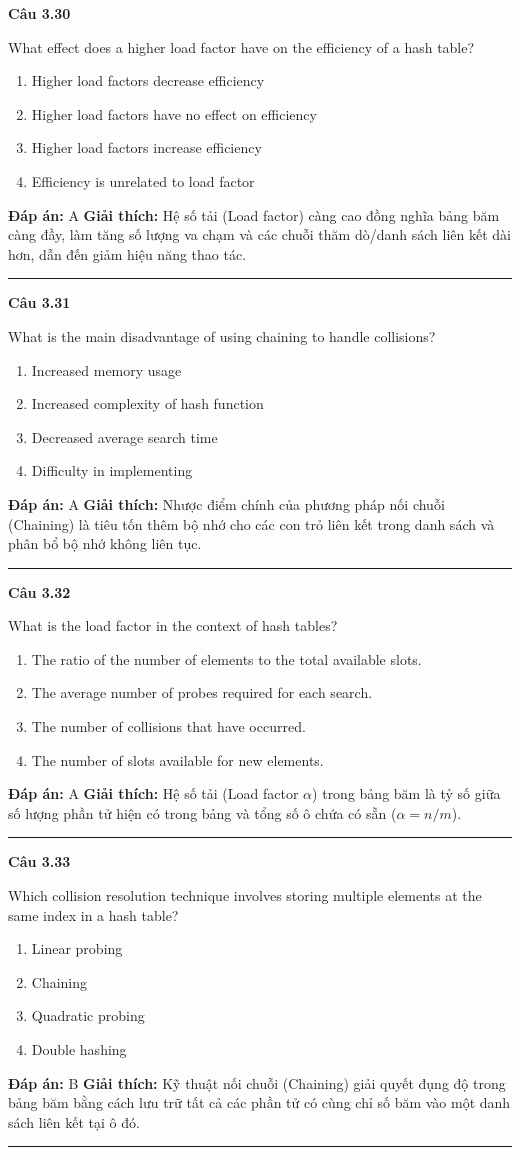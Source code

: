 \documentclass[11pt,a4paper]{article}
\newenvironment{question}[1]{%
  \par\vspace{1em}\noindent\textbf{\large Câu #1}\par\vspace{0.4em}
}{%
  \par\vspace{1em}\hrule\vspace{0.6em}
}
\newenvironment{choices}{%
  \begin{enumerate}[label=\textbf{\Alph*.},leftmargin=2.2em,itemsep=2pt,topsep=3pt]
}{%
  \end{enumerate}
}
\newcommand{\choice}{\item}
\begin{document}
\begin{question}{3.30}
What effect does a higher load factor have on the efficiency of a hash table?
\begin{choices}
\choice Higher load factors decrease efficiency
\choice Higher load factors have no effect on efficiency
\choice Higher load factors increase efficiency
\choice Efficiency is unrelated to load factor
\end{choices}
\textbf{Đáp án:} A
\textbf{Giải thích:} Hệ số tải (Load factor) càng cao đồng nghĩa bảng băm càng đầy, làm tăng số lượng va chạm và các chuỗi thăm dò/danh sách liên kết dài hơn, dẫn đến giảm hiệu năng thao tác.
\end{question}

\begin{question}{3.31}
What is the main disadvantage of using chaining to handle collisions?
\begin{choices}
\choice Increased memory usage
\choice Increased complexity of hash function
\choice Decreased average search time
\choice Difficulty in implementing
\end{choices}
\textbf{Đáp án:} A
\textbf{Giải thích:} Nhược điểm chính của phương pháp nối chuỗi (Chaining) là tiêu tốn thêm bộ nhớ cho các con trỏ liên kết trong danh sách và phân bổ bộ nhớ không liên tục.
\end{question}

\begin{question}{3.32}
What is the load factor in the context of hash tables?
\begin{choices}
\choice The ratio of the number of elements to the total available slots.
\choice The average number of probes required for each search.
\choice The number of collisions that have occurred.
\choice The number of slots available for new elements.
\end{choices}
\textbf{Đáp án:} A
\textbf{Giải thích:} Hệ số tải (Load factor $\alpha$) trong bảng băm là tỷ số giữa số lượng phần tử hiện có trong bảng và tổng số ô chứa có sẵn ($\alpha = n/m$).
\end{question}

\begin{question}{3.33}
Which collision resolution technique involves storing multiple elements at the same index in a hash table?
\begin{choices}
\choice Linear probing
\choice Chaining
\choice Quadratic probing
\choice Double hashing
\end{choices}
\textbf{Đáp án:} B
\textbf{Giải thích:} Kỹ thuật nối chuỗi (Chaining) giải quyết đụng độ trong bảng băm bằng cách lưu trữ tất cả các phần tử có cùng chỉ số băm vào một danh sách liên kết tại ô đó.
\end{question}
\end{document}
